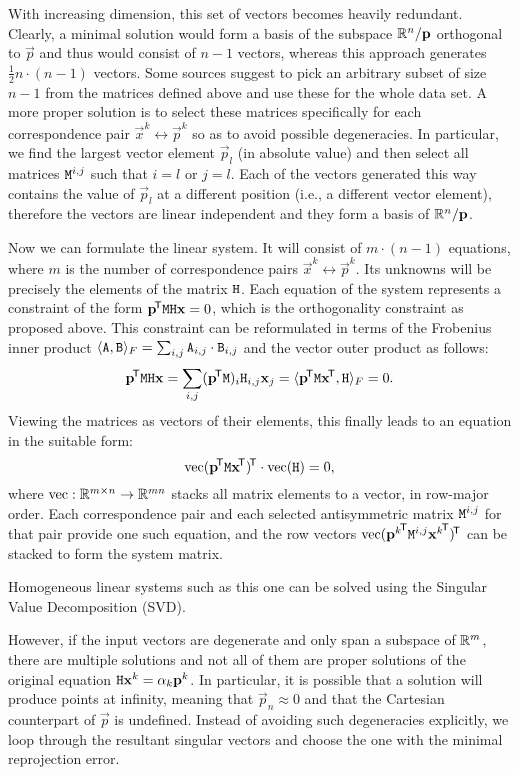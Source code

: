 With increasing dimension, this set of vectors becomes heavily redundant.
Clearly, a minimal solution would form a basis of the subspace $\mathbb{R}^n / \mathbf{p}$ orthogonal to $\vec p$ and thus would consist of $n - 1$ vectors, whereas this approach generates $\frac {1} {2} n \cdot (n - 1)$ vectors.
Some sources\cite{MVG} suggest to pick an arbitrary subset of size $n - 1$ from the matrices defined above and use these for the whole data set.
A more proper solution is to select these matrices specifically for each correspondence pair $\vec x^k \leftrightarrow \vec p^k$ so as to avoid possible degeneracies.
In particular, we find the largest vector element $\vec p_l$ (in absolute value) and then select all matrices $\mathtt{M}^{i, j}$ such that $i = l$ or $j = l$.
Each of the vectors generated this way contains the value of $\vec p_l$ at a different position (i.e., a different vector element), therefore the vectors are linear independent and they form a basis of $\mathbb{R}^n / \mathbf{p}$.

Now we can formulate the linear system.
It will consist of $m \cdot (n - 1)$ equations, where $m$ is the number of correspondence pairs $\vec x^k \leftrightarrow \vec p^k$.
Its unknowns will be precisely the elements of the matrix $\mathtt{H}$.
Each equation of the system represents a constraint of the form $\mathbf{p}^{\!\mathsf{T}} \mathtt{M} \mathtt{H} \mathbf{x} = 0$, which is the orthogonality constraint as proposed above.
This constraint can be reformulated in terms of the Frobenius inner product $\langle \mathtt{A}, \mathtt{B} \rangle_F = \sum_{i, j} \mathtt{A}_{i, j} \cdot \mathtt{B}_{i, j}$ and the vector outer product as follows:
$$\mathbf{p}^{\!\mathsf{T}} \mathtt{M} \mathtt{H} \mathbf{x} = \sum_{i, j} (\mathbf{p}^{\!\mathsf{T}} \mathtt{M})_i \mathtt{H}_{i, j} \mathbf{x}_j = \langle \mathbf{p}^{\!\mathsf{T}} \mathtt{M} \mathbf{x}^{\!\mathsf{T}}, \mathtt{H} \rangle_F = 0.$$
Viewing the matrices as vectors of their elements, this finally leads to an equation in the suitable form:
$$\mathrm{vec} (\mathbf{p}^{\!\mathsf{T}} \mathtt{M} \mathbf{x}^{\!\mathsf{T}})^{\!\mathsf{T}} \cdot \mathrm{vec}(\mathtt{H}) = 0,$$
where $\mathrm{vec} : \mathbb{R}^{m \times n} \to \mathbb{R}^{mn}$ stacks all matrix elements to a vector, in row-major order.
Each correspondence pair and each selected antisymmetric matrix $\mathtt{M}^{i, j}$ for that pair provide one such equation, and the row vectors $\mathrm{vec} ({\mathbf{p}^k}^{\!\mathsf{T}} \mathtt{M}^{i, j} {\mathbf{x}^k}^{\!\mathsf{T}})^{\!\mathsf{T}}$ can be stacked to form the system matrix.

Homogeneous linear systems such as this one can be solved using the Singular Value Decomposition (SVD).

\todo{\dots}
However, if the input vectors are degenerate and only span a subspace of $\mathbb{R}^m$, there are multiple solutions and not all of them are proper solutions of the original equation $\mathtt{H} \mathbf{x}^k = \alpha_k \mathbf{p}^k$.
In particular, it is possible that a solution will produce points at infinity, meaning that $\vec p_n \approx 0$ and that the Cartesian counterpart of $\vec p$ is undefined.
Instead of avoiding such degeneracies explicitly, we loop through the resultant singular vectors and choose the one with the minimal reprojection error.

